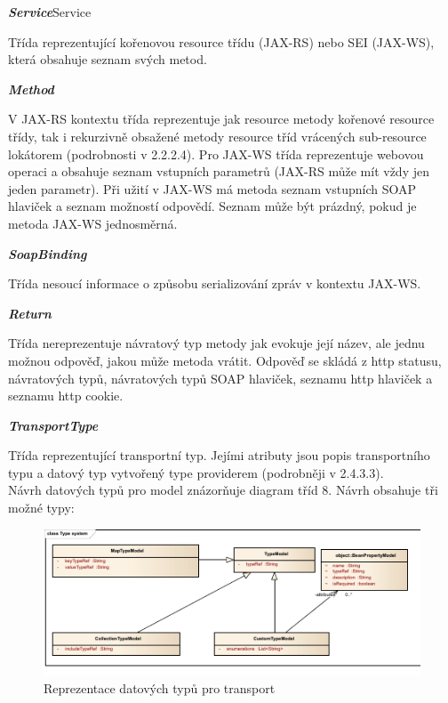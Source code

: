 \documentclass[11pt,twoside,a4paper]{book}
\begin{document}
\textbf{\textit{Service}}Service

Třída reprezentující kořenovou resource třídu (JAX-RS) nebo SEI (JAX-WS), která obsahuje
seznam svých metod.

\textbf{\textit{Method}}

V JAX-RS kontextu třída reprezentuje jak resource metody kořenové resource třídy, tak i
rekurzivně obsažené metody resource tříd vrácených sub-resource lokátorem (podrobnosti v
2.2.2.4). Pro JAX-WS třída reprezentuje webovou operaci a obsahuje seznam vstupních
parametrů (JAX-RS může mít vždy jen jeden parametr). Při užití v JAX-WS má metoda
seznam vstupních SOAP hlaviček a seznam možností odpovědí. Seznam může být prázdný,
pokud je metoda JAX-WS jednosměrná.

\textbf{\textit{SoapBinding}}

Třída nesoucí informace o způsobu serializování zpráv v kontextu JAX-WS.

\textbf{\textit{Return}}

Třída nereprezentuje návratový typ metody jak evokuje její název, ale jednu možnou
odpověď, jakou může metoda vrátit. Odpověď se skládá z http statusu, návratových typů,
návratových typů SOAP hlaviček, seznamu http hlaviček a seznamu http cookie.

\textbf{\textit{TransportType}}

Třída reprezentující transportní typ. Jejími atributy jsou popis transportního typu a datový typ
vytvořený type providerem (podrobněji v 2.4.3.3).
\mbox{}\\
Návrh datových typů pro model znázorňuje diagram tříd 8. Návrh obsahuje tři možné typy:

\begin{figure}[h]
\begin{center}
\includegraphics[width=13cm]{images-pdf/Type-System.pdf}
\caption{Reprezentace datových typů pro transport}
\label{fig:logo}
\end{center}
\end{figure}
\end{document}
